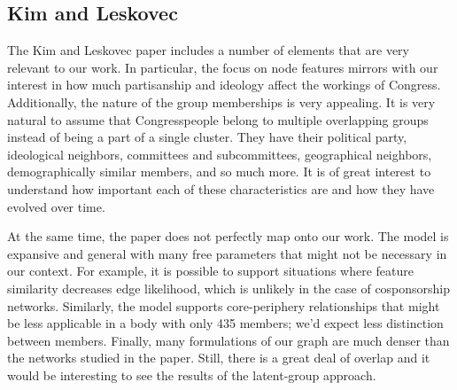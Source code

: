 \subsection{Kim and Leskovec}

The Kim and Leskovec paper includes a number of elements that are very relevant to our work. In particular, the focus on node features mirrors with our interest in how much partisanship and ideology affect the workings of Congress. Additionally, the nature of the group memberships is very appealing. It is very natural to assume that Congresspeople belong to multiple overlapping groups instead of being a part of a single cluster. They have their political party, ideological neighbors, committees and subcommittees, geographical neighbors, demographically similar members, and so much more. It is of great interest to understand how important each of these characteristics are and how they have evolved over time.

At the same time, the paper does not perfectly map onto our work. The model is expansive and general with many free parameters that might not be necessary in our context. For example, it is possible to support situations where feature similarity decreases edge likelihood, which is unlikely in the case of cosponsorship networks. Similarly, the model supports core-periphery relationships that might be less applicable in a body with only 435 members; we'd expect less distinction between members. Finally, many formulations of our graph are much denser than the networks studied in the paper. Still, there is a great deal of overlap and it would be interesting to see the results of the latent-group approach.
